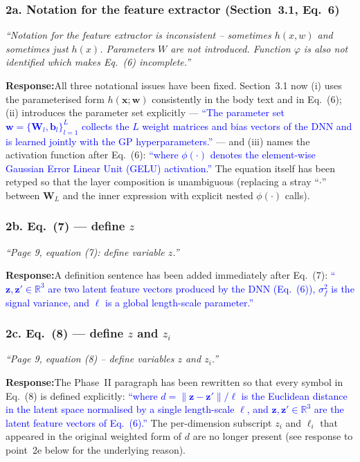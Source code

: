 \documentclass[11pt,a4paper]{article}
\newcommand{\new}[1]{\textcolor{blue}{#1}}
\newcommand{\rev}[1]{\par\noindent\textit{\small #1}\par\smallskip}
\newcommand{\resp}{\par\noindent\textbf{Response:}\space}
\begin{document}
\subsubsection*{2a. Notation for the feature extractor (Section~3.1, Eq.~6)}
\rev{``Notation for the feature extractor is inconsistent -- sometimes $h(x, w)$ and sometimes just $h(x)$. Parameters $W$ are not introduced. Function $\varphi$ is also not identified which makes Eq.~(6) incomplete.''}
\resp All three notational issues have been fixed. Section~3.1 now (i) uses the parameterised form $h(\mathbf{x}; \mathbf{w})$ consistently in the body text and in Eq.~(6); (ii) introduces the parameter set explicitly --- \new{``The parameter set $\mathbf{w} = \{\mathbf{W}_l, \mathbf{b}_l\}_{l=1}^{L}$ collects the $L$ weight matrices and bias vectors of the DNN and is learned jointly with the GP hyperparameters.''} --- and (iii) names the activation function after Eq.~(6): \new{``where $\phi(\cdot)$ denotes the element-wise Gaussian Error Linear Unit (GELU) activation.''} The equation itself has been retyped so that the layer composition is unambiguous (replacing a stray ``$\cdot$'' between $\mathbf{W}_L$ and the inner expression with explicit nested $\phi(\cdot)$ calls).

\subsubsection*{2b. Eq.~(7) --- define $z$}
\rev{``Page 9, equation (7): define variable $z$.''}
\resp A definition sentence has been added immediately after Eq.~(7): \new{``$\mathbf{z}, \mathbf{z}' \in \mathbb{R}^3$ are two latent feature vectors produced by the DNN (Eq.~(6)), $\sigma_f^2$ is the signal variance, and $\ell$ is a global length-scale parameter.''}

\subsubsection*{2c. Eq.~(8) --- define $z$ and $z_i$}
\rev{``Page 9, equation (8) -- define variables $z$ and $z_i$.''}
\resp The Phase~II paragraph has been rewritten so that every symbol in Eq.~(8) is defined explicitly: \new{``where $d = \|\mathbf{z}-\mathbf{z}'\|/\ell$ is the Euclidean distance in the latent space normalised by a single length-scale $\ell$, and $\mathbf{z}, \mathbf{z}' \in \mathbb{R}^3$ are the latent feature vectors of Eq.~(6).''} The per-dimension subscript $z_i$ and $\ell_i$ that appeared in the original weighted form of $d$ are no longer present (see response to point~2e below for the underlying reason).
\end{document}
